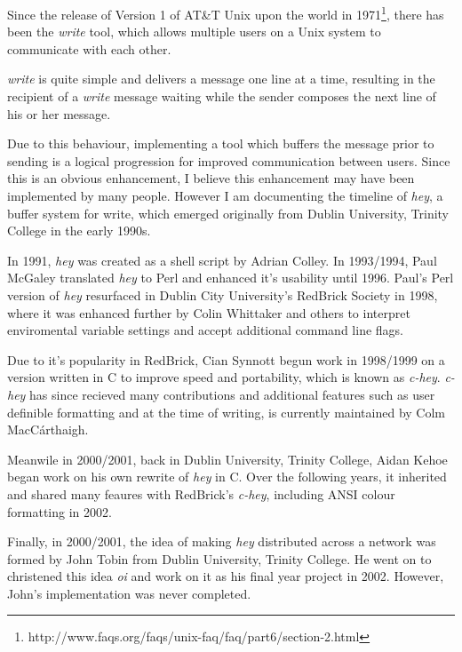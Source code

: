 Since the release of Version 1 of AT\&T Unix upon the world 
in 1971\footnote{http://www.faqs.org/faqs/unix-faq/faq/part6/section-2.html}, 
there has been the \emph{write} tool, which allows multiple users on a Unix 
system to communicate with each other.


\emph{write} is quite simple and delivers a message one line at a time,
resulting in the recipient of a \emph{write} message waiting while the
sender composes the next line of his or her message.


Due to this behaviour, implementing a tool which buffers the message
prior to sending is a logical progression for improved communication
between users. Since this is an obvious enhancement, I believe this
enhancement may have been implemented by many people. However I am 
documenting the timeline of \emph{hey}, a buffer system for write,
which emerged originally from Dublin University, Trinity College in the 
early 1990s.


In 1991, \emph{hey} was created as a shell script by Adrian Colley. In 
1993/1994, Paul McGaley translated \emph{hey} to Perl and enhanced it's 
usability until 1996. Paul's Perl version of \emph{hey} resurfaced in 
Dublin City University's RedBrick Society in 1998, where it was enhanced
further by Colin Whittaker and others to interpret enviromental variable 
settings and accept additional command line flags.


Due to it's popularity in RedBrick, Cian Synnott begun work in 1998/1999
on a version written in C to improve speed and portability, which is 
known as \emph{c-hey}. \emph{c-hey} has since recieved many 
contributions and additional features such as user definible formatting 
and at the time of writing, is currently maintained by Colm 
MacC\'{a}rthaigh.


Meanwile in 2000/2001, back in Dublin University, Trinity College, Aidan 
Kehoe began work on his own rewrite of \emph{hey} in C. Over the 
following years, it inherited and shared many feaures with RedBrick's 
\emph{c-hey}, including ANSI colour formatting in 2002.


Finally, in 2000/2001, the idea of making \emph{hey} distributed across 
a network was formed by John Tobin from Dublin University, Trinity 
College.  He went on to christened this idea \emph{oi} and work on it 
as his final year project in 2002. However, John's implementation was
never completed.
